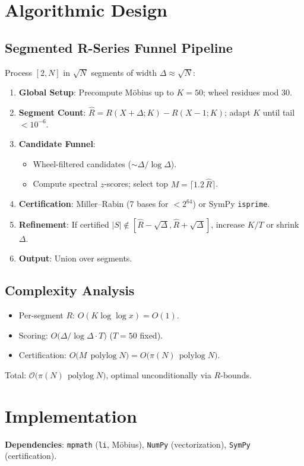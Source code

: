 \documentclass[11pt]{article}
\newcommand{\polylog}{\operatorname{polylog}}
\newcommand{\bigO}{\mathcal{O}}
\begin{document}
\section{Algorithmic Design}

\subsection{Segmented R-Series Funnel Pipeline}
Process $[2, N]$ in $\sqrt{N}$ segments of width $\Delta \approx \sqrt{N}$:
\begin{enumerate}
  \item \textbf{Global Setup}: Precompute M\"obius up to $K{=}50$; wheel residues mod 30.
  \item \textbf{Segment Count}: $\hat{R} = R(X{+}\Delta; K) - R(X{-}1; K)$; adapt $K$ until tail $< 10^{-6}$.
  \item \textbf{Candidate Funnel}:
    \begin{itemize}
      \item Wheel-filtered candidates ($\sim \Delta / \log \Delta$).
      \item Compute spectral $z$-scores; select top $M = \lceil 1.2 \,\hat{R} \rceil$.
    \end{itemize}
  \item \textbf{Certification}: Miller--Rabin (7 bases for $<2^{64}$) or SymPy \texttt{isprime}.
  \item \textbf{Refinement}: If certified $|S| \notin [\hat{R} - \sqrt{\Delta}, \hat{R} + \sqrt{\Delta}]$, increase $K/T$ or shrink $\Delta$.
  \item \textbf{Output}: Union over segments.
\end{enumerate}

\subsection{Complexity Analysis}
\begin{itemize}
  \item Per-segment $R$: $O(K \log\log x) = O(1)$.
  \item Scoring: $O\!\big(\Delta / \log \Delta \cdot T\big)$ ($T{=}50$ fixed).
  \item Certification: $O\!\big(M\,\polylog N\big) = O\!\big(\pi(N)\,\polylog N\big)$.
\end{itemize}
Total: $\bigO\!\big(\pi(N)\,\polylog N\big)$, optimal unconditionally via $R$-bounds.

\section{Implementation}
\textbf{Dependencies}: \texttt{mpmath} (\texttt{li}, M\"obius), \texttt{NumPy} (vectorization), \texttt{SymPy} (certification).
\end{document}
